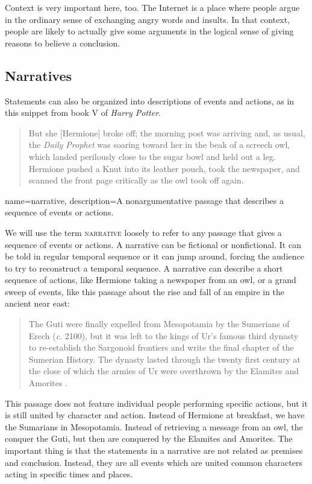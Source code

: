 Context is very important here, too. The Internet is a place where people argue in the ordinary sense of exchanging angry words and insults. In that context, people are likely to actually give some arguments in the logical sense of giving reasons to believe a conclusion.

\subsection{Narratives}

Statements can also be organized into descriptions of events and actions, as in this snippet from book V of \textit{Harry Potter}.

\begin{quotation} \noindent But she [Hermione] broke off; the morning post was arriving and, as usual, the \textit{Daily Prophet} was soaring toward her in the beak of a screech owl, which landed perilously close to the sugar bowl and held out a leg. Hermione pushed a Knut into its leather pouch, took the newspaper, and scanned the front page critically as the owl took off again. \citep{Rowling2003} \end{quotation}

{
name=narrative,
description={A nonargumentative passage that describes a sequence of events or actions.}
}

We will use the term \textsc{\gls{narrative}} \label{def:narrative} loosely to refer to any passage that gives a sequence of events or actions. A narrative can be fictional or nonfictional. It can be told in regular temporal sequence or it can jump around, forcing the audience to try to reconstruct a temporal sequence. A narrative can describe a short sequence of actions, like Hermione taking a newspaper from an owl, or a grand sweep of events, like this passage about the  rise and fall of an empire in the ancient near east:

\begin{quotation}
The Guti were finally expelled from Mesopotamia by the Sumerians of Erech (\textit{c}. 2100), but it was left to the kings of Ur's famous third dynasty to re-establish the Sargonoid frontiers and write the final chapter of the Sumerian History. The dynasty lasted through the twenty first century at the close of which the armies of Ur were overthrown by the Elamites and Amorites \citep{McEvedy1967}.
\end{quotation}

This passage does not feature individual people performing specific actions, but it is still united by character and action. Instead of Hermione at breakfast, we have the Sumarians in Mesopotamia. Instead of retrieving a message from an owl, the conquer the Guti, but then are conquered by the Elamites and Amorites. The important thing is that the statements in a narrative are not related as premises and conclusion. Instead, they are all events which are united common characters acting in specific times and places.




